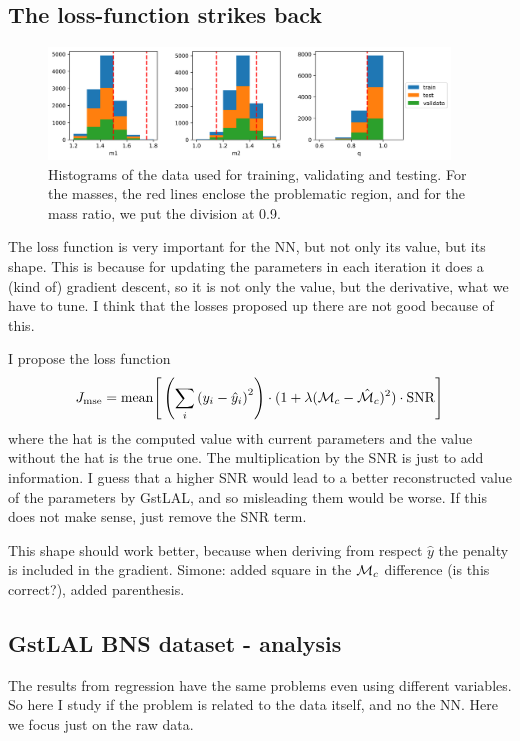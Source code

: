 \documentclass[prd,aps,twocolumn,a4paper,showkeys,nofootinbib]{revtex4-1}
\def\Mc{{\cal M}_c}
\begin{document}
%
\subsection{The loss-function strikes back}
%
\begin{figure}[]
  \center
  \includegraphics[width=0.95\textwidth]{./Figs/hists_data}
  \caption{\label{fig:analysisGstLAL} Histograms of the data used for training, validating and testing. For the masses, the red lines enclose the problematic region, and for the mass ratio, we put the division at 0.9.}
\end{figure}
%
\label{sec:loss_new}
The loss function is very important for the NN, but not only its value, but its shape. This is because for updating the parameters in each iteration it does a (kind of) gradient descent, so it is not only the value, but the derivative, what we have to tune. I think that the losses proposed up there are not good because of this.

I propose the loss function 
\begin{equation}
J_{\rm mse} = {\rm mean} \Bigg[ \left( \sum_i \left( y_i - \hat{y}_i \right)^2 \right) \cdot(1+\lambda(\mathcal{M}_c-\hat{\mathcal{M}}_c)^2)\cdot \rm{SNR} \Bigg]
\end{equation}
where the hat is the computed value with current parameters and the value without the hat is the true one. The multiplication by the SNR is just to add information. I guess that a higher SNR would lead to a better reconstructed value of the parameters by GstLAL, and so misleading them would be worse. If this does not make sense, just remove the SNR term.

This shape should work better, because when deriving from respect $\hat{y}$ the penalty is included in the gradient. 
Simone: added square in the $\Mc$ difference (is this correct?), added parenthesis.



\subsection{GstLAL BNS dataset - analysis}
\label{sec:GstLALanalysis}
The results from regression have the same problems even using different variables. So here I study if the problem is related to the data itself, and no the NN. Here we focus just on the raw data.
\end{document}

